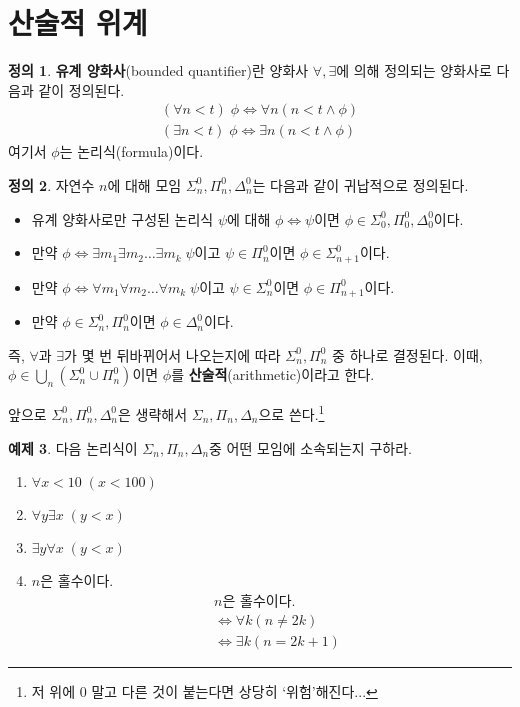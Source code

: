 \documentclass[b5paper, 11pt]{book}
\theoremstyle{definition}
\newtheorem{defn}{정의}[chapter]
\newtheorem{ex}[defn]{예제}
\begin{document}
\section{산술적 위계}
\begin{defn}
    \textbf{유계 양화사}(bounded quantifier)란 양화사 $\forall, \exists$에 의해
    정의되는 양화사로 다음과 같이 정의된다. 
    \begin{align*}
        (\forall n < t )\; \phi \Leftrightarrow \forall n (n < t \wedge \phi) \\
        (\exists n < t )\; \phi \Leftrightarrow \exists n (n < t \wedge \phi)
    \end{align*}
    여기서 $\phi$는 논리식(formula)이다. 
\end{defn}
\begin{defn}
    자연수 $n$에 대해 모임 $\Sigma_n^0, \Pi_n^0, \Delta_n^0$는 다음과 같이 귀납적으로 정의된다.
    \begin{itemize}
        \item 유계 양화사로만 구성된 논리식 $\psi$에 대해 $\phi \Leftrightarrow \psi$이면 $\phi \in 
        \Sigma_0^0, \Pi_0^0, \Delta_0^0$이다. 
        \item 만약 $\phi \Leftrightarrow \exists m_1 \exists m_2 \ldots \exists m_k \; \psi$이고
        $\psi \in \Pi_n^0$이면 $\phi \in \Sigma_{n+1}^0$이다.  
        \item 만약 $\phi \Leftrightarrow \forall m_1 \forall m_2 \ldots \forall m_k \; \psi$이고
        $\psi \in \Sigma_n^0$이면 $\phi \in \Pi_{n+1}^0$이다.  
        \item 만약 $\phi \in \Sigma_n^0, \Pi_n^0$이면 $\phi \in \Delta_n^0$이다.
    \end{itemize}
    즉, $\forall $과 $\exists$가 몇 번 뒤바뀌어서 나오는지에 따라 $\Sigma_n^0, \Pi_n^0$ 중 하나로 결정된다. 이때, $\phi \in \bigcup_n (\Sigma_n^0 \cup \Pi_n^0 )$이면 $\phi$를 \textbf{산술적}(arithmetic)이라고 한다.
\end{defn}
앞으로 $\Sigma_n^0, \Pi_n^0, \Delta_n^0$은 생략해서 $\Sigma_n, \Pi_n, \Delta_n$으로 쓴다.\footnote{저 위에 0 말고 다른 것이 붙는다면 상당히 `위험'해진다...}
\begin{ex}
    다음 논리식이 $\Sigma_n, \Pi_n, \Delta_n$중 어떤 모임에 소속되는지 구하라.
    \begin{enumerate}
        \item $\forall x < 10 \; (x < 100)$ 
        \item $\forall y \exists x \; (y < x)$
        \item $\exists y \forall x \; (y < x)$
        \item $n$은 홀수이다.
        \begin{align*}
            &n\text{은 홀수이다.} \\ 
            &\Leftrightarrow \forall k (n \neq 2k) \\ 
            &\Leftrightarrow \exists k (n = 2k + 1)
        \end{align*}
    \end{enumerate}
\end{ex}
\end{document}
